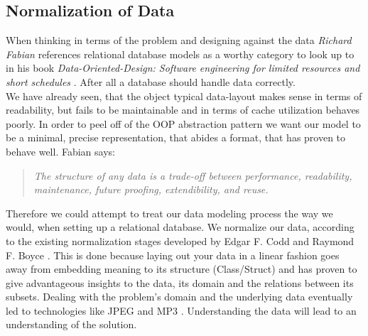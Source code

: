 \subsection{Normalization of Data}
When thinking in terms of the problem and designing against the data \textit{Richard Fabian} references relational database models as a worthy category to look up to in his book \textit{Data-Oriented-Design: Software engineering for limited resources and short schedules} . After all a database should handle data correctly.\\
We have already seen, that the object typical data-layout makes sense in terms of readability, but fails to be maintainable and in terms of cache utilization behaves poorly. In order to peel off of the OOP abstraction pattern we want our model to be a minimal, precise representation, that abides a format, that has proven to behave well. Fabian says:
\begin{quote}
	\textit{The structure of any data is a trade-off between performance, readability, maintenance, future proofing, extendibility, and reuse.} 
\end{quote}
Therefore we could attempt to treat our data modeling process the way we would, when setting up a relational database. We normalize our data, according to the existing normalization stages developed by Edgar F. Codd and Raymond F. Boyce . This is done because laying out your data in a linear fashion goes away from embedding meaning to its structure (Class/Struct)  and has proven to give advantageous insights to the data, its domain and the relations between its subsets. Dealing with the problem's domain and the underlying data eventually led to technologies like JPEG and MP3 . Understanding the data will lead to an understanding of the solution.
\begin{table}[H]
	\centering
\end{table}
